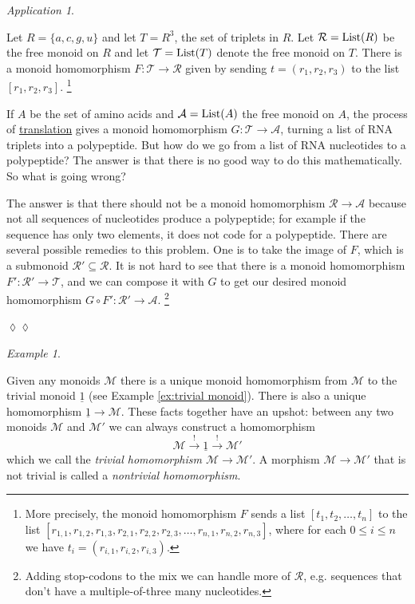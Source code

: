 \documentclass{book}
\def\tn{\textnormal}
\def\mc{\mathcal}
\def\List{\tn{List}}
\def\to{\rightarrow}
\def\taking{\colon}
\def\ss{\subseteq}
\def\ul{\underline}
\newcommand{\Too}[1]{\xrightarrow{\ \ #1\ \ }}
\def\mcA{\mc{A}}
\def\mcM{\mc{M}}
\def\mcR{\mc{R}}
\def\mcT{\mc{T}}
\theoremstyle{remark}
\newtheorem{example}[subsubsection]{Example}
\newtheorem{app}[subsubsection]{Application}
\newenvironment{application}{\begin{app}}{\hspace*{\fill}$\lozenge\lozenge$\end{app}}
\theoremstyle{definition}
\begin{document}
\begin{application}\label{app:RNA reader 1}

Let $R=\{a,c,g,u\}$ and let $T=R^3$, the set of triplets in $R$. Let $\mcR=\List(R)$ be the free monoid on $R$ and let $\mcT=\List(T)$ denote the free monoid on $T$. There is a monoid homomorphism $F\taking\mcT\to\mcR$ given by sending $t=(r_1,r_2,r_3)$ to the list $[r_1,r_2,r_3]$.
\footnote{More precisely, the monoid homomorphism $F$ sends a list $[t_1,t_2,\ldots,t_n]$ to the list $[r_{1,1},r_{1,2},r_{1,3},r_{2,1},r_{2,2},r_{2,3},\ldots,r_{n,1},r_{n,2},r_{n,3}]$, where for each $0\leq i\leq n$ we have $t_i=(r_{i,1},r_{i,2},r_{i,3})$.}

If $A$ be the set of amino acids and $\mcA=\List(A)$ the free monoid on $A$, the process of \href{http://en.wikipedia.org/wiki/Translation_(biology)}{\text translation} gives a monoid homomorphism $G\taking\mcT\to\mcA$, turning a list of RNA triplets into a polypeptide. But how do we go from a list of RNA nucleotides to a polypeptide? The answer is that there is no good way to do this mathematically. So what is going wrong?

The answer is that there should not be a monoid homomorphism $\mcR\to\mcA$ because not all sequences of nucleotides produce a polypeptide; for example if the sequence has only two elements, it does not code for a polypeptide. There are several possible remedies to this problem. One is to take the image of $F$, which is a submonoid $\mcR'\ss\mcR$. It is not hard to see that there is a monoid homomorphism $F'\taking\mcR'\to\mcT$, and we can compose it with $G$ to get our desired monoid homomorphism $G\circ F'\taking\mcR'\to\mcA$. 
\footnote{Adding stop-codons to the mix we can handle more of $\mcR$, e.g. sequences that don't have a multiple-of-three many nucleotides.}

\end{application}

\begin{example}\label{ex:trivial monoid homomorphism}

Given any monoids $\mcM$ there is a unique monoid homomorphism from $\mcM$ to the trivial monoid $\ul{1}$ (see Example \ref{ex:trivial monoid}). There is also a unique homomorphism $\ul{1}\to\mcM$. These facts together have an upshot: between any two monoids $\mcM$ and $\mcM'$ we can always construct a homomorphism 
$$\mcM\Too{!}\ul{1}\Too{!}\mcM'$$
which we call the {\em trivial homomorphism $\mcM\to\mcM'$}. A morphism $\mcM\to\mcM'$ that is not trivial is called a {\em nontrivial homomorphism}.

\end{example}
\end{document}
